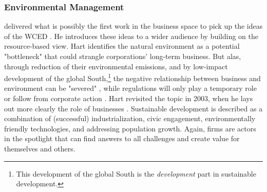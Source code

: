 
\subsubsection*{Environmental Management}

\citet{Hart1995b} delivered what is possibly the first work in the business space to pick up the ideas of the WCED \citep{Montiel2014}. He introduces these ideas to a wider audience by building on the resource-based view. Hart identifies the natural environment as a potential "bottleneck" that could strangle corporations' long-term business. But alas, through reduction of their environmental emissions, and by low-impact development of the global South,\footnote{This development of the global South is the \textit{development} part in sustainable development.} the negative relationship between business and environment can be "severed" \citep[p. 996]{Hart1995b}, while regulations will only play a temporary role or follow from corporate action \citep[footnote p. 991, p. 995]{Hart1995b}.
Hart revisited the topic in 2003, when he lays out more clearly the role of businesses \citep{Hart2003}. Sustainable development is described as a combination of (successful) industrialization, civic engagement, environmentally friendly technologies, and addressing population growth. Again, firms are actors in the spotlight that can find answers to all challenges and create value for themselves and others.

